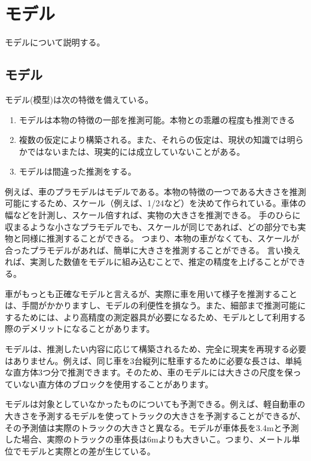 \chapter{モデル}
モデルについて説明する。

\section{モデル}
モデル(模型)は次の特徴を備えている。
\begin{enumerate}
 \item モデルは本物の特徴の一部を推測可能。本物との乖離の程度も推測できる
 \item 複数の仮定により構築される。また、それらの仮定は、現状の知識では明らかではないまたは、現実的には成立していないことがある。
 \item モデルは間違った推測をする。
\end{enumerate}
  
例えば、車のプラモデルはモデルである。本物の特徴の一つである大きさを推測可能にするため、スケール（例えば、1/24など）を決めて作られている。車体の幅などを計測し、スケール倍すれば、実物の大きさを推測できる。
手のひらに収まるような小さなプラモデルでも、スケールが同じであれば、どの部分でも実物と同様に推測することができる。
つまり、本物の車がなくても、スケールが合ったプラモデルがあれば、簡単に大きさを推測することができる。
言い換えれば、実測した数値をモデルに組み込むことで、推定の精度を上げることができる。

車がもっとも正確なモデルと言えるが、実際に車を用いて様子を推測することは、手間がかかりますし、モデルの利便性を損なう。また、細部まで推測可能にするためには、より高精度の測定器具が必要になるため、モデルとして利用する際のデメリットになることがあります。

モデルは、推測したい内容に応じて構築されるため、完全に現実を再現する必要はありません。例えば、同じ車を3台縦列に駐車するために必要な長さは、単純な直方体3つ分で推測できます。そのため、車のモデルには大きさの尺度を保っていない直方体のブロックを使用することがあります。

モデルは対象としていなかったものについても予測できる。例えば、軽自動車の大きさを予測するモデルを使ってトラックの大きさを予測することができるが、その予測値は実際のトラックの大きさと異なる。モデルが車体長を3.4mと予測した場合、実際のトラックの車体長は6mよりも大きいこ。つまり、メートル単位でモデルと実際との差が生じている。

